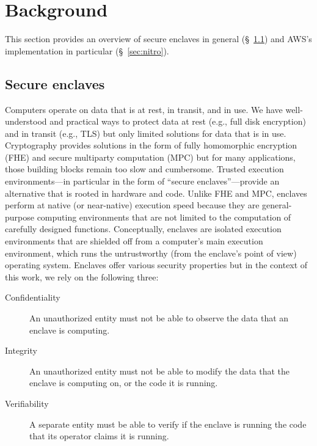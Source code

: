 \section{Background}
\label{sec:background}

This section provides an overview of secure enclaves in general
(\S~\ref{sec:enclaves}) and AWS's implementation in particular
(\S~\ref{sec:nitro}).

\subsection{Secure enclaves}
\label{sec:enclaves}

\cite{Bean2022a}

Computers operate on data that is at rest, in transit, and in use.  We have
well-understood and practical ways to protect data at rest (e.g., full disk
encryption) and in transit (e.g., TLS) but only limited solutions for data that
is in use.  Cryptography provides solutions in the form of fully homomorphic
encryption (FHE) and secure multiparty computation (MPC) but for many
applications, those building blocks remain too slow and cumbersome.  Trusted
execution environments---in particular in the form of ``secure
enclaves''---provide an alternative that is rooted in hardware and code.  Unlike
FHE and MPC, enclaves perform at native (or near-native) execution speed because
they are general-purpose computing environments that are not limited to the
computation of carefully designed functions.  Conceptually, enclaves are
isolated execution environments that are shielded off from a computer's main
execution environment, which runs the untrustworthy (from the enclave's point of
view) operating system.  Enclaves offer various security properties but in the
context of this work, we rely on the following three:

\begin{description}
  \item[Confidentiality] An unauthorized entity must not be able to observe the
    data that an enclave is computing.

  \item[Integrity] An unauthorized entity must not be able to modify the data
    that the enclave is computing on, or the code it is running.

  \item[Verifiability] A separate entity must be able to verify if the enclave
    is running the code that its operator claims it is running.
\end{description}

